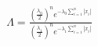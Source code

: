\documentclass[preview]{standalone}
\begin{document}
\begin{align*}
\Lambda = \frac{\left(\frac{\lambda_0}{2}\right)^n e^{-\lambda_0\sum_{i=1}^n |x_i|}}{\left(\frac{\lambda_1}{2}\right)^n e^{-\lambda_1\sum_{i=1}^n |x_i|}}
\end{align*}
\end{document}
